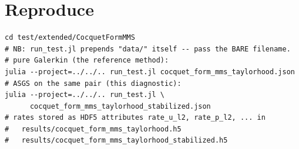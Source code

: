 \documentclass[11pt]{article}
\begin{document}
\section*{Reproduce}
\begin{verbatim}
cd test/extended/CocquetFormMMS
# NB: run_test.jl prepends "data/" itself -- pass the BARE filename.
# pure Galerkin (the reference method):
julia --project=../../.. run_test.jl cocquet_form_mms_taylorhood.json
# ASGS on the same pair (this diagnostic):
julia --project=../../.. run_test.jl \
      cocquet_form_mms_taylorhood_stabilized.json
# rates stored as HDF5 attributes rate_u_l2, rate_p_l2, ... in
#   results/cocquet_form_mms_taylorhood.h5
#   results/cocquet_form_mms_taylorhood_stabilized.h5
\end{verbatim}
\end{document}
